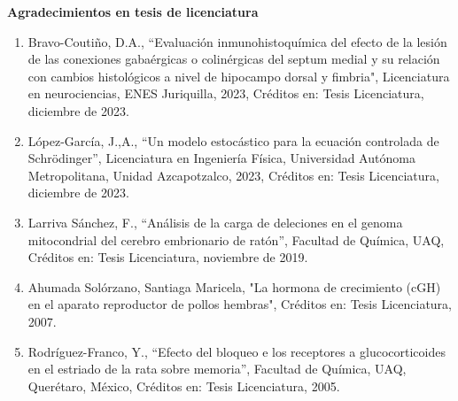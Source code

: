 \textbf{Agradecimientos en tesis de licenciatura}

\begin{enumerate}

\item Bravo-Coutiño, D.A., “Evaluación inmunohistoquímica del efecto de la lesión de las conexiones gabaérgicas o 
colinérgicas 
del septum medial y su relación con cambios histológicos a nivel de hipocampo dorsal y fimbria", Licenciatura en 
neurociencias, ENES Juriquilla, 2023, Créditos en: Tesis Licenciatura, diciembre de 2023.

\item López-García, J.,A., “Un modelo estocástico para la ecuación controlada de Schrödinger”, Licenciatura en Ingeniería 
Física, Universidad Autónoma Metropolitana, Unidad Azcapotzalco, 2023, Créditos en: Tesis Licenciatura, diciembre de 2023.

\item Larriva Sánchez, F., “Análisis de la carga de deleciones en el genoma mitocondrial del cerebro embrionario de ratón”, 
Facultad de Química, UAQ, Créditos en: Tesis Licenciatura, noviembre de 2019.

\item Ahumada Solórzano, Santiaga Maricela, "La hormona de crecimiento (cGH) en el aparato reproductor de pollos hembras", 
Créditos en: Tesis Licenciatura, 2007.

\item Rodríguez-Franco, Y., “Efecto del bloqueo e los receptores a glucocorticoides en el estriado de la rata sobre 
memoria”, 
Facultad de Química, UAQ, Querétaro, México, Créditos en: Tesis Licenciatura, 2005.

\end{enumerate}

